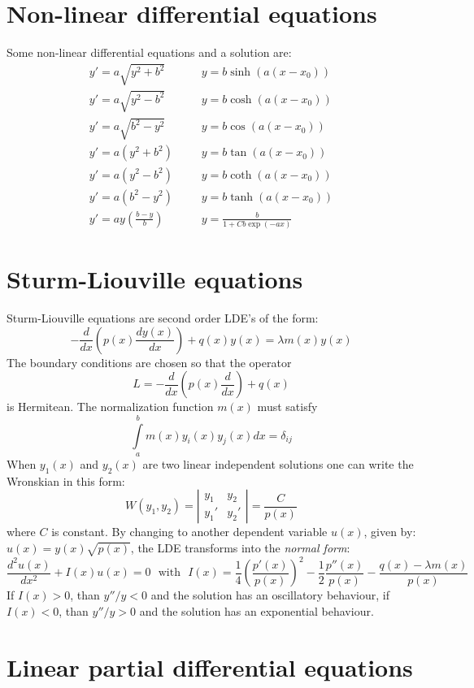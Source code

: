 \section{Non-linear differential equations}
Some non-linear differential equations and a solution are:
\[
\begin{array}{lll}
y'=a\sqrt{y^2+b^2}&~~~~&y=b\sinh(a(x-x_0))\\
y'=a\sqrt{y^2-b^2}&~~~~&y=b\cosh(a(x-x_0))\\
y'=a\sqrt{b^2-y^2}&~~~~&y=b\cos(a(x-x_0))\\
y'=a(y^2+b^2)     &~~~~&y=b\tan(a(x-x_0))\\
y'=a(y^2-b^2)     &~~~~&y=b\coth(a(x-x_0))\\
y'=a(b^2-y^2)     &~~~~&y=b\tanh(a(x-x_0))\\
\displaystyle y'=ay\left(\frac{b-y}{b}\right)&~~~~&\displaystyle y=\frac{b}{1+Cb\exp(-ax)}
\end{array}
\]

\section{Sturm-Liouville equations}
Sturm-Liouville equations are second order LDE's of the form:
\[
-\frac{d}{dx}\left(p(x)\frac{dy(x)}{dx}\right)+q(x)y(x)=\lambda m(x)y(x)
\]
The boundary conditions are chosen so that the operator
\[
L=-\frac{d}{dx}\left(p(x)\frac{d}{dx}\right)+q(x)
\]
is Hermitean. The normalization function $m(x)$ must satisfy
\[
\int\limits_a^bm(x)y_i(x)y_j(x)dx=\delta_{ij}
\]
When $y_1(x)$ and $y_2(x)$ are two linear independent solutions one can write
the Wronskian in this form:
\[
W(y_1,y_2)=\left|\begin{array}{cc}y_1&y_2\\ y_1'&y_2' \end{array}\right|=
\frac{C}{p(x)}
\]
where $C$ is constant. By changing to another dependent variable $u(x)$,
given by: $u(x)=y(x)\sqrt{p(x)}$, the LDE transforms into the
{\it normal form}:
\[
\frac{d^2u(x)}{dx^2}+I(x)u(x)=0~~~\mbox{with}~~~
I(x)=\frac{1}{4}\left(\frac{p'(x)}{p(x)}\right)^2-\frac{1}{2}\frac{p''(x)}{p(x)}-\frac{q(x)-\lambda m(x)}{p(x)}
\]
If $I(x)>0$, than $y''/y<0$ and the solution has an oscillatory behaviour,
if $I(x)<0$, than $y''/y>0$ and the solution has an exponential behaviour.

\section{Linear partial differential equations}
